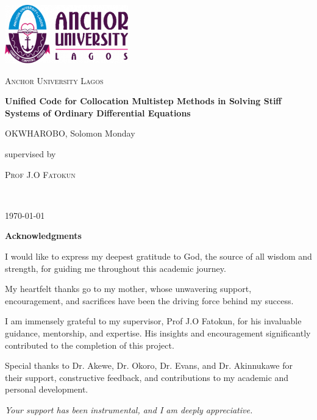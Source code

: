 \documentclass[a4paper, twoside]{report} %
\begin{document}
\fontsize{13}{15}\selectfont
\begin{titlepage}
   \centering
   \vspace*{1cm}
   \includegraphics[width=0.4\textwidth]{aul_logo.png}\par
   \vspace{1.5cm}
   {\scshape\LARGE Anchor University Lagos \par}
   \vspace{1cm}
   \vspace{1.5cm}
   {\huge\bfseries Unified Code for Collocation Multistep Methods in Solving Stiff Systems of Ordinary Differential Equations\par}
   \vspace{2cm}
   {\Large OKWHAROBO, Solomon Monday\par}
   \vfill
   supervised by\par
   \textsc{Prof J.O Fatokun}
  
   
    \\
   

   \vfill

   {\large \today\par}
\end{titlepage}


\begin{titlepage}
  \centering
  \vspace*{2cm}
  \LARGE\textbf{Acknowledgments}
  
  \vspace{1cm}
  \large
  I would like to express my deepest gratitude to God, the source of all wisdom and strength, for guiding me throughout this academic journey.

  \vspace{0.5cm}
  My heartfelt thanks go to my mother, whose unwavering support, encouragement, and sacrifices have been the driving force behind my success.

  \vspace{0.5cm}
  I am immensely grateful to my supervisor, Prof J.O Fatokun, for his invaluable guidance, mentorship, and expertise. His insights and encouragement significantly contributed to the completion of this project.

  \vspace{0.5cm}
  Special thanks to Dr. Akewe, Dr. Okoro, Dr. Evans, and Dr. Akinnukawe for their support, constructive feedback, and contributions to my academic and personal development.

  \vspace{2cm}
  \textit{Your support has been instrumental, and I am deeply appreciative.}
\end{titlepage}
\end{document}
